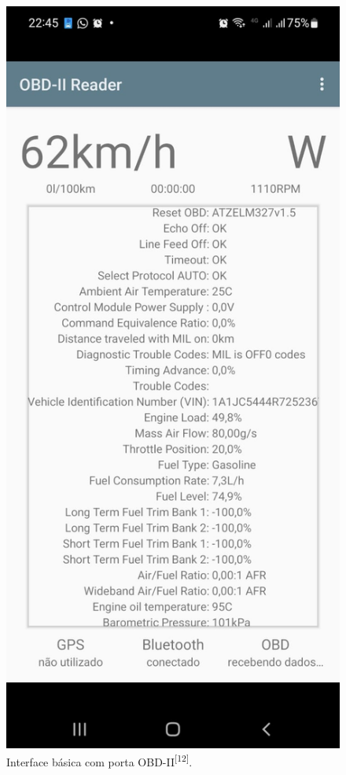 \begin{figure}[hp]
    \centering
    
    \includegraphics[scale=0.3]{figures/obd2.jpg}
    
    \caption{Interface básica com porta OBD-II\textsuperscript{[12]}.}
    
    \label{fig:obd2_plataforma}
\end{figure}
    
